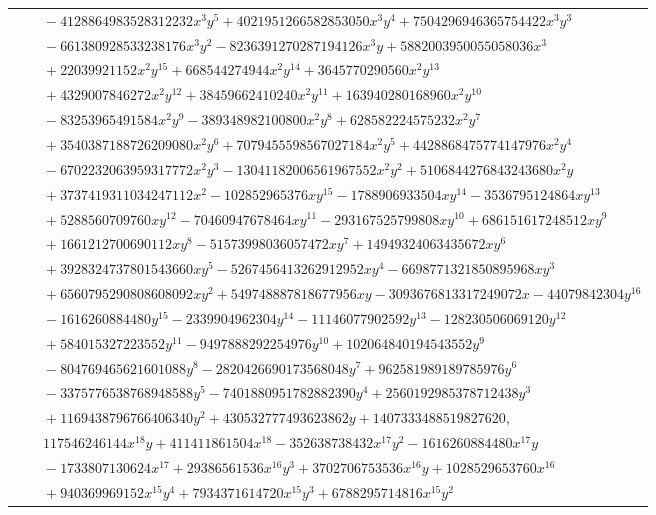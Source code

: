 \documentclass[11pt]{article}
\begin{document}
\begin{longtable}{@{}ll@{}}
 & $\quad -4128864983528312232x^{3}y^{5}+4021951266582853050x^{3}y^{4}+7504296946365754422x^{3}y^{3}$\\
 & $\quad -661380928533238176x^{3}y^{2}-8236391270287194126x^{3}y+5882003950055058036x^{3}$\\
 & $\quad +22039921152x^{2}y^{15}+668544274944x^{2}y^{14}+3645770290560x^{2}y^{13}$\\
 & $\quad +4329007846272x^{2}y^{12}+38459662410240x^{2}y^{11}+163940280168960x^{2}y^{10}$\\
 & $\quad -83253965491584x^{2}y^{9}-389348982100800x^{2}y^{8}+628582224575232x^{2}y^{7}$\\
 & $\quad +3540387188726209080x^{2}y^{6}+7079455598567027184x^{2}y^{5}+4428868475774147976x^{2}y^{4}$\\
 & $\quad -6702232063959317772x^{2}y^{3}-13041182006561967552x^{2}y^{2}+5106844276843243680x^{2}y$\\
 & $\quad +3737419311034247112x^{2}-102852965376xy^{15}-1788906933504xy^{14}-3536795124864xy^{13}$\\
 & $\quad +5288560709760xy^{12}-70460947678464xy^{11}-293167525799808xy^{10}+686151617248512xy^{9}$\\
 & $\quad +1661212700690112xy^{8}-51573998036057472xy^{7}+14949324063435672xy^{6}$\\
 & $\quad +3928324737801543660xy^{5}-5267456413262912952xy^{4}-6698771321850895968xy^{3}$\\
 & $\quad +6560795290808608092xy^{2}+549748887818677956xy-3093676813317249072x-44079842304y^{16}$\\
 & $\quad -1616260884480y^{15}-2339904962304y^{14}-11146077902592y^{13}-128230506069120y^{12}$\\
 & $\quad +584015327223552y^{11}-9497888292254976y^{10}+102064840194543552y^{9}$\\
 & $\quad -804769465621601088y^{8}-2820426690173568048y^{7}+962581989189785976y^{6}$\\
 & $\quad -3375776538768948588y^{5}-7401880951782882390y^{4}+2560192985378712438y^{3}$\\
 & $\quad +1169438796766406340y^{2}+430532777493623862y+1407333488519827620,$\\
 & $\quad 117546246144x^{18}y+411411861504x^{18}-352638738432x^{17}y^{2}-1616260884480x^{17}y$\\
 & $\quad -1733807130624x^{17}+29386561536x^{16}y^{3}+3702706753536x^{16}y+1028529653760x^{16}$\\
 & $\quad +940369969152x^{15}y^{4}+7934371614720x^{15}y^{3}+6788295714816x^{15}y^{2}$\\

\end{longtable}
\end{document}
